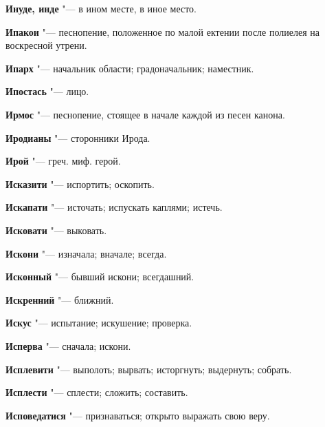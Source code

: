 \begin{mymulticols}{2}
\noindent\textbf{Инуде, инде} "--- в ином месте, в иное место. 




\noindent\textbf{Ипакои} "--- песнопение, положенное по малой ектении после полиелея на воскресной утрени. 




\noindent\textbf{Ипарх} "--- начальник области; градоначальник; наместник. 




\noindent\textbf{Ипостась} "--- лицо. 




\noindent\textbf{Ирмос} "--- песнопение, стоящее в начале каждой из песен канона. 




\noindent\textbf{Иродианы} "--- сторонники Ирода. 




\noindent\textbf{Ирой} "--- греч. миф. герой. 




\noindent\textbf{Исказити} "--- испортить; оскопить. 




\noindent\textbf{Искапати} "--- источать; испускать каплями; истечь. 




\noindent\textbf{Исковати} "--- выковать. 




\noindent\textbf{Искони} "--- изначала; вначале; всегда. 




\noindent\textbf{Исконный} "--- бывший искони; всегдашний. 




\noindent\textbf{Искренний} "--- ближний. 




\noindent\textbf{Искус} "--- испытание; искушение; проверка. 




\noindent\textbf{Исперва} "--- сначала; искони. 




\noindent\textbf{Исплевити} "--- выполоть; вырвать; исторгнуть; выдернуть; собрать. 




\noindent\textbf{Исплести} "--- сплести; сложить; составить. 




\noindent\textbf{Исповедатися} "--- признаваться; открыто выражать свою веру. 





\end{mymulticols}
